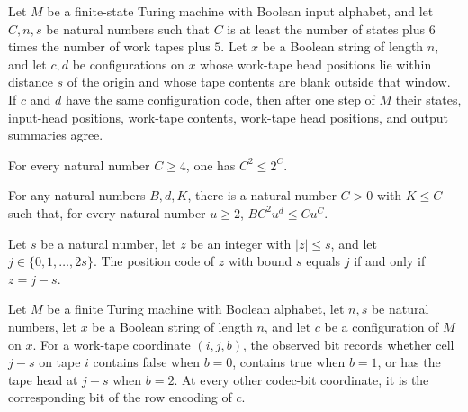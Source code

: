 \begin{theorem}
\label{Complexity.configurationCodec_step_congr}
\leanok
{}
Let $M$ be a finite-state Turing machine with Boolean input alphabet, and let $C,n,s$ be
natural numbers such that $C$ is at least the number of states plus $6$ times the number
of work tapes plus $5$. Let $x$ be a Boolean string of length $n$, and let $c,d$ be
configurations on $x$ whose work-tape head positions lie within distance $s$ of the
origin and whose tape contents are blank outside that window. If $c$ and $d$ have the
same configuration code, then after one step of $M$ their states, input-head positions,
work-tape contents, work-tape head positions, and output summaries agree.
\end{theorem}

\begin{theorem}
\label{Complexity.codec_square_le_pow}
\leanok
{}
For every natural number $C \ge 4$, one has $C^2 \le 2^C$.
\end{theorem}

\begin{theorem}
\label{Complexity.codec_absorb}
\leanok
{}
For any natural numbers $B,d,K$, there is a natural number $C>0$ with $K\le C$ such
that, for every natural number $u\ge2$, $B C^2 u^d\le C u^C$.
\end{theorem}

\begin{theorem}
\label{Complexity.codec_posCode_eq_iff}
\leanok
{}
Let $s$ be a natural number, let $z$ be an integer with $|z|\le s$, and let
$j\in\{0,1,\ldots,2s\}$. The position code of $z$ with bound $s$ equals $j$ if and only
if $z=j-s$.
\end{theorem}

\begin{definition}
\label{Complexity.codecObserve}
\leanok
{}
Let $M$ be a finite Turing machine with Boolean alphabet, let $n,s$ be natural numbers,
let $x$ be a Boolean string of length $n$, and let $c$ be a configuration of $M$ on $x$.
For a work-tape coordinate $(i,j,b)$, the observed bit records whether cell $j-s$ on
tape $i$ contains false when $b=0$, contains true when $b=1$, or has the tape head at
$j-s$ when $b=2$. At every other codec-bit coordinate, it is the corresponding bit of
the row encoding of $c$.
\end{definition}

